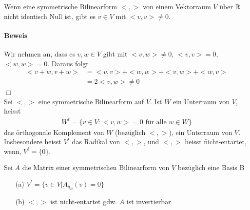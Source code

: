 \begin{lemma} %
\label{lemma522}
Wenn eine symmetrische Bilinearform $<, >$ von einem Vektorraum $V$ über $\mathbb{R}$ nicht identisch Null ist, gibt es $v \in V$ mit $<v, v> \neq 0$.
\end{lemma}

\paragraph{Beweis}
Wir nehmen an, dass es $v, w \in V$ gibt mit $<v, w> \neq 0$, $<v, v> = 0$, $<w, w> = 0$.
Daraus folgt
\begin{align}
<v+w, v+w> &= <v, v> + <w, w> + <v, w> + <w, v> \\
&= 2<v, w> \neq 0
\end{align}
\hspace{1cm} \hfill $\Box$ \\
Sei $<, >$ eine symmetrische Bilinearform auf $V$. Ist $W$ ein Unterraum von $V$, heisst
\begin{align}
W^t = \{v \in V: <v, w> = 0 \text{ für alle } w \in W\}
\end{align}
das \f{orthogonale Komplement von $W$} (bezüglich $<, >$), ein Unterraum von $V$.\\
Insbesondere heisst $V^t$ das \f{Radikal} von $<, >$, und $<, >$ heisst \f{nicht-entartet}, wenn, $V^t = \{0\}$.

\begin{lemma} %
\label{lemma523}
Sei $A$ die Matrix einer symmetrischen Bilinearform von $V$ bezüglich eine Basis B
\begin{itemize}
\item[(a)] $V^t = \{v \in V | A_{q_B}(v) = 0\}$
\item[(b)] $<, >$ ist nicht-entartet gdw. $A$ ist invertierbar
\end{itemize}
\end{lemma}

